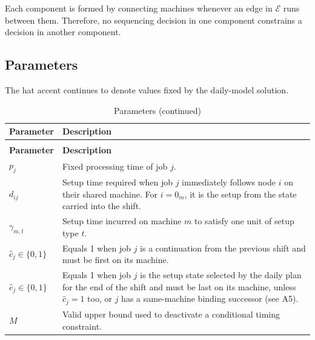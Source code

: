 \documentclass{article}
\begin{document}
Each component is formed by connecting machines whenever an edge in
$\mathcal{E}$ runs between them. Therefore, no sequencing decision in one
component constrains a decision in another component.

\subsection{Parameters}

The hat accent continues to denote values fixed by the daily-model solution.

\begingroup
\small
\setlength{\LTleft}{0pt}
\setlength{\LTright}{0pt}
\setlength{\tabcolsep}{4pt}
\renewcommand{\arraystretch}{1.15}

\begin{longtable}{@{}L{0.30\textwidth}L{0.64\textwidth}@{}}
\caption{Parameters}
\label{tab:seq-parameters} \\

\toprule
\textbf{Parameter} & \textbf{Description} \\
\midrule
\endfirsthead

\caption[]{Parameters (continued)} \\
\toprule
\textbf{Parameter} & \textbf{Description} \\
\midrule
\endhead

\bottomrule
\endlastfoot

$p_j$ & Fixed processing time of job $j$. \\

$d_{ij}$ & Setup time required when job $j$ immediately follows node $i$ on their shared machine. For $i=0_m$, it is the setup from the state carried into the shift. \\

$\gamma_{m,t}$ & Setup time incurred on machine $m$ to satisfy one unit of setup type $t$. \\

$\hat c_j\in\{0,1\}$ & Equals 1 when job $j$ is a continuation from the previous shift and must be first on its machine. \\

$\hat e_j\in\{0,1\}$ & Equals 1 when job $j$ is the setup state selected by the daily plan for the end of the shift and must be last on its machine, unless $\hat c_j=1$ too, or $j$ has a same-machine binding successor (see A5). \\

$M$ & Valid upper bound used to deactivate a conditional timing constraint. \\

\end{longtable}
\endgroup
\end{document}
